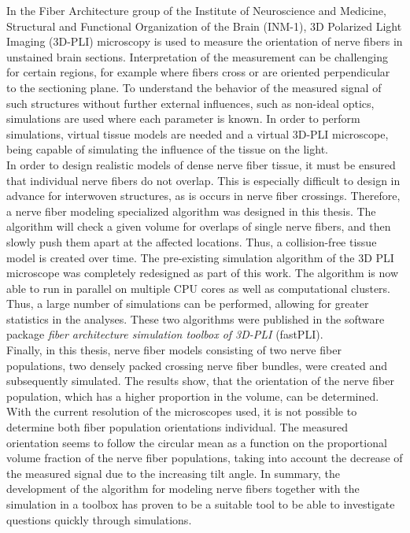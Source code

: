 %
In the Fiber Architecture group of the Institute of Neuroscience and Medicine, Structural and Functional Organization of the Brain (INM-1), 3D Polarized Light Imaging (3D-PLI) microscopy is used to measure the orientation of nerve fibers in unstained brain sections.
Interpretation of the measurement can be challenging for certain regions, for example where fibers cross or are oriented perpendicular to the sectioning plane.
To understand the behavior of the measured signal of such structures without further external influences, such as non-ideal optics, simulations are used where each parameter is known.
In order to perform simulations, virtual tissue models are needed and a virtual 3D-PLI microscope, being capable of simulating the influence of the tissue on the light.
\\
%
In order to design realistic models of dense nerve fiber tissue, it must be ensured that individual nerve fibers do not overlap.
This is especially difficult to design in advance for interwoven structures, as is occurs in nerve fiber crossings.
Therefore, a nerve fiber modeling specialized algorithm was designed in this thesis.
The algorithm will check a given volume for overlaps of single nerve fibers, and then slowly push them apart at the affected locations.
Thus, a collision-free tissue model is created over time.
The pre-existing simulation algorithm of the 3D PLI microscope was completely redesigned as part of this work.
The algorithm is now able to run in parallel on multiple CPU cores as well as computational clusters.
Thus, a large number of simulations can be performed, allowing for greater statistics in the analyses.
These two algorithms were published in the software package \textit{fiber architecture simulation toolbox of 3D-PLI} (fastPLI).
\\
%
Finally, in this thesis, nerve fiber models consisting of two nerve fiber populations, \ie{} two densely packed crossing nerve fiber bundles, were created and subsequently simulated.
The results show, that the orientation of the nerve fiber population, which has a higher proportion in the volume, can be determined.
With the current resolution of the microscopes used, it is not possible to determine both fiber population orientations individual.
The measured orientation seems to follow the circular mean as a function on the proportional volume fraction of the nerve fiber populations, taking into account the decrease of the measured signal due to the increasing tilt angle.
In summary, the development of the algorithm for modeling nerve fibers together with the simulation in a toolbox has proven to be a suitable tool to be able to investigate questions quickly through simulations.
